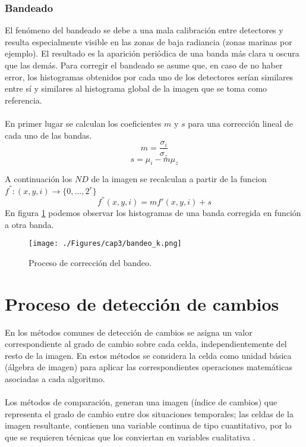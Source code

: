 \subsubsection{Bandeado}\label{subsec:bandeado}
El fen\'omeno del bandeado se debe a una mala calibraci\'on entre detectores y resulta especialmente visible en las zonas de baja radiancia (zonas marinas por ejemplo). El resultado es la aparici\'on peri\'odica de una banda m\'as clara u oscura que las dem\'as.
Para corregir el bandeado se asume que, en caso de no haber error, los histogramas obtenidos por cada uno de los detectores ser\'ian similares entre s\'i y similares al histograma global de la imagen que se toma como referencia.\\~\\
En primer lugar se calculan los coeficientes $ m $ y $ s $ para una correcci\'on lineal de cada uno de las bandas.
		\begin{equation}
		m =\dfrac{\sigma_{i}}{\sigma_{z}}
		\end{equation} 	
				\begin{equation}
				s=\mu_{i} - m\mu_{z}
				\end{equation} 	
				

A continuaci\'on los $ ND $ de la imagen se recalculan a partir de la funcion $ f^{''}:(x,y,i) \longrightarrow \{0,...,2^{r}\} $
				\begin{equation}
				f^{''}(x,y,i) = m f'(x,y,i) + s
				\end{equation} 				
En figura \ref{fig:bandeado} podemos observar los histogramas de una banda corregida en funci\'on a otra banda.
    \begin{figure}[H]
    	\centering
    	\texttt{[image: ./Figures/cap3/bandeo\_k.png]}
    	\caption{Proceso de correcci\'on del bandeo.}
    	\label{fig:bandeado}
    \end{figure}

\section{Proceso de detecci\'on de cambios}
En los m\'etodos comunes de detecci\'on de cambios se asigna un valor correspondiente al grado de cambio sobre cada celda, independientemente del resto de la imagen. En estos m\'etodos se considera la celda como unidad b\'asica (\'algebra de imagen) para aplicar las correspondientes operaciones matem\'aticas asociadas a cada algoritmo.\\~\\
Los m\'etodos de comparaci\'on, generan una imagen (\'indice de cambios) que representa el grado de cambio entre dos situaciones temporales; las celdas de la imagen resultante, contienen una variable continua de tipo cuantitativo, por lo que se requieren t\'ecnicas que los conviertan en variables cualitativa \cite{martinez2013normalizacion}.
